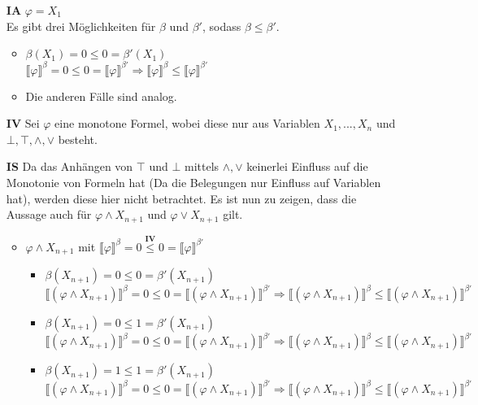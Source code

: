 \documentclass[a4paper,10pt]{article}
\begin{document}
\begin{itemize}
\item[\textbf{IA}] $\varphi = X_1$ \\ 
Es gibt drei Möglichkeiten für $\beta$ und $\beta'$, sodass $\beta \leq \beta'$. 
\begin{itemize}
\item $\beta(X_1) = 0 \leq  0 = \beta'(X_1)$ \\
$\llbracket \varphi \rrbracket^{\beta} = 0 \leq 0 = \llbracket \varphi \rrbracket^{\beta'} \Rightarrow \llbracket \varphi \rrbracket^{\beta} \leq \llbracket \varphi \rrbracket^{\beta'} $
\item Die anderen Fälle sind analog.
\end{itemize}
\item[\textbf{IV}] Sei $\varphi$ eine monotone Formel, wobei diese nur aus Variablen $X_1,...,X_n$ und $\bot,\top,\land,\lor$ besteht.
\item[\textbf{IS}] Da das Anhängen von $\top$ und $\bot$ mittels $\land, \lor$ keinerlei Einfluss auf die Monotonie von Formeln hat (Da die Belegungen nur Einfluss auf Variablen hat), werden diese hier nicht betrachtet. Es ist nun zu zeigen, dass die Aussage auch für $\varphi \land X_{n+1}$ und $\varphi \lor X_{n+1}$ gilt.
\begin{itemize}
\item $\varphi \land X_{n+1}$ mit $\llbracket \varphi \rrbracket^{\beta} = 0 \stackrel{\textbf{IV}}{\leq} 0 = \llbracket \varphi \rrbracket^{\beta'}$ 
\begin{itemize}
\item $\beta(X_{n+1}) = 0 \leq 0 = \beta'(X_{n+1})$ \\
$\llbracket (\varphi \land X_{n+1}) \rrbracket^{\beta} = 0 \leq 0 = \llbracket (\varphi \land X_{n+1})  \rrbracket^{\beta'} \Rightarrow \llbracket (\varphi \land X_{n+1})  \rrbracket^{\beta} \leq \llbracket (\varphi \land X_{n+1})  \rrbracket^{\beta'} $
\item $\beta(X_{n+1}) = 0 \leq 1 = \beta'(X_{n+1})$ \\
$\llbracket (\varphi \land X_{n+1}) \rrbracket^{\beta} = 0 \leq 0 = \llbracket (\varphi \land X_{n+1})  \rrbracket^{\beta'} \Rightarrow \llbracket (\varphi \land X_{n+1})  \rrbracket^{\beta} \leq \llbracket (\varphi \land X_{n+1})  \rrbracket^{\beta'} $
\item $\beta(X_{n+1}) = 1 \leq 1 = \beta'(X_{n+1})$ \\
$\llbracket (\varphi \land X_{n+1}) \rrbracket^{\beta} = 0 \leq 0 = \llbracket (\varphi \land X_{n+1})  \rrbracket^{\beta'} \Rightarrow \llbracket (\varphi \land X_{n+1})  \rrbracket^{\beta} \leq \llbracket (\varphi \land X_{n+1})  \rrbracket^{\beta'} $

\end{itemize}
\end{itemize}
\end{itemize}
\end{document}
